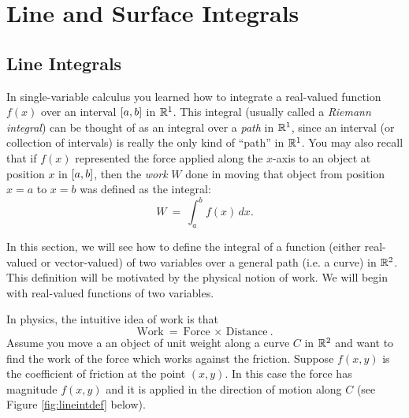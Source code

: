 \chapter{Line and Surface Integrals}
\label{chapter:surface-integrals}
\section{Line Integrals}
In single-variable calculus you learned how to integrate a real-valued function $f(x)$ over an interval $\lbrack a,b \rbrack$ in $\mathbb{R}^{1}$. 
This integral (usually called a \emph{Riemann integral})
can be thought of as an integral over a \emph{path} in $\mathbb{R}^{1}$, since an interval
(or collection of intervals) is really the only kind of ``path'' in $\mathbb{R}^{1}$. 
You may also recall that if $f(x)$
represented the force applied along the $x$-axis to an object at position $x$ in $\lbrack a,b \rbrack$, then the \emph{work}
$W$ done in moving that object from position $x=a$ to $x=b$ was defined as the integral:
\begin{displaymath}
W ~=~ \int_a^b f(x)\,dx.
\end{displaymath}

In this section, we will see how to define the integral of a function (either real-valued or vector-valued) of
two variables over a general path (i.e. a curve) in $\mathbb{R}^{2}$. This
definition will be motivated by the physical notion of work. We will begin with real-valued functions of
two variables.

In physics, the intuitive idea of work is that
\begin{displaymath}
 \text{Work} ~=~ \text{Force}\,\times\,\text{Distance} ~.
\end{displaymath}
Assume you move a an object of unit weight along a curve $C$ in
$\mathbb{R}^{2}$ 
and want to find the work of the force which works against the friction.
Suppose $f(x,y)$ is the coefficient of friction at the point $(x,y)$.
In this case the force has magnitude $f(x,y)$ and it is applied in the direction of motion along $C$ (see Figure \ref{fig:lineintdef} below).

